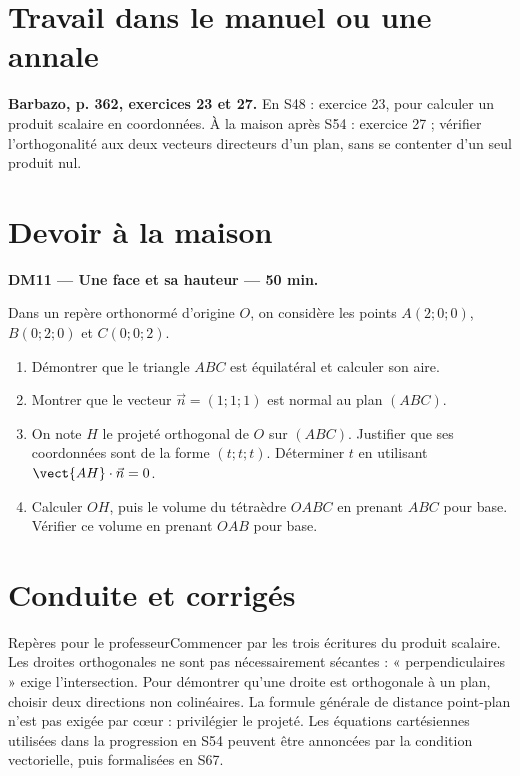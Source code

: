 \section{Travail dans le manuel ou une annale}\textbf{Barbazo, p. 362, exercices 23 et 27.} En S48 : exercice 23, pour calculer un produit scalaire en coordonnées. À la maison après S54 : exercice 27 ; vérifier l'orthogonalité aux deux vecteurs directeurs d'un plan, sans se contenter d'un seul produit nul.

\section{Devoir à la maison}\textbf{DM11 --- Une face et sa hauteur --- 50 min.}\par Dans un repère orthonormé d'origine $O$, on considère les points $A(2;0;0)$, $B(0;2;0)$ et $C(0;0;2)$.
\begin{enumerate}\item Démontrer que le triangle $ABC$ est équilatéral et calculer son aire.
\item Montrer que le vecteur $\vec n=(1;1;1)$ est normal au plan $(ABC)$.
\item On note $H$ le projeté orthogonal de $O$ sur $(ABC)$. Justifier que ses coordonnées sont de la forme $(t;t;t)$. Déterminer $t$ en utilisant $\vect{AH}\cdot\vec n=0$.
\item Calculer $OH$, puis le volume du tétraèdre $OABC$ en prenant $ABC$ pour base. Vérifier ce volume en prenant $OAB$ pour base.\end{enumerate}

\ifprof\clearpage\section{Conduite et corrigés}\begin{profbox}{Repères pour le professeur}Commencer par les trois écritures du produit scalaire. Les droites orthogonales ne sont pas nécessairement sécantes : « perpendiculaires » exige l'intersection. Pour démontrer qu'une droite est orthogonale à un plan, choisir deux directions non colinéaires. La formule générale de distance point-plan n'est pas exigée par cœur : privilégier le projeté. Les équations cartésiennes utilisées dans la progression en S54 peuvent être annoncées par la condition vectorielle, puis formalisées en S67.\end{profbox}

